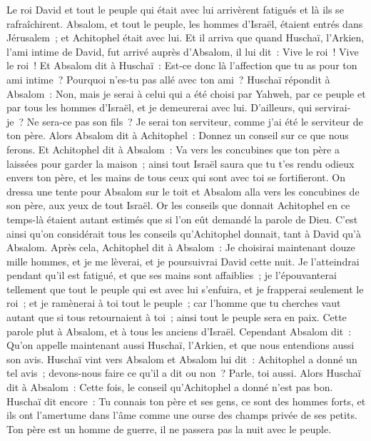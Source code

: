 \begin{multicols}{2}
Le roi David et tout le peuple qui était avec lui arrivèrent fatigués et là ils se rafraîchirent.
Absalom, et tout le peuple, les hommes d'Israël, étaient entrés dans Jérusalem~; et Achitophel était avec lui.
Et il arriva que quand Huschaï, l'Arkien, l'ami intime de David, fut arrivé auprès d'Absalom, il lui dit~: Vive le roi~! Vive le roi~!
Et Absalom dit à Huschaï~: Est-ce donc là l'affection que tu as pour ton ami intime~? Pourquoi n'es-tu pas allé avec ton ami~?
Huschaï répondit à Absalom~: Non, mais je serai à celui qui a été choisi par Yahweh, par ce peuple et par tous les hommes d'Israël, et je demeurerai avec lui.
D'ailleurs, qui servirai-je~? Ne sera-ce pas son fils~? Je serai ton serviteur, comme j'ai été le serviteur de ton père.
Alors Absalom dit à Achitophel~: Donnez un conseil sur ce que nous ferons.
Et Achitophel dit à Absalom~: Va vers les concubines que ton père a laissées pour garder la maison~; ainsi tout Israël saura que tu t'es rendu odieux envers ton père, et les mains de tous ceux qui sont avec toi se fortifieront.
On dressa une tente pour Absalom sur le toit et Absalom alla vers les concubines de son père, aux yeux de tout Israël.
Or les conseils que donnait Achitophel en ce temps-là étaient autant estimés que si l'on eût demandé la parole de Dieu. C'est ainsi qu'on considérait tous les conseils qu'Achitophel donnait, tant à David qu'à Absalom.
\VerseOne{}Après cela, Achitophel dit à Absalom~: Je choisirai maintenant douze mille hommes, et je me lèverai, et je poursuivrai David cette nuit.
Je l'atteindrai pendant qu'il est fatigué, et que ses mains sont affaiblies~; je l'épouvanterai tellement que tout le peuple qui est avec lui s'enfuira, et je frapperai seulement le roi~;
et je ramènerai à toi tout le peuple~; car l'homme que tu cherches vaut autant que si tous retournaient à toi~; ainsi tout le peuple sera en paix.
Cette parole plut à Absalom, et à tous les anciens d'Israël.
Cependant Absalom dit~: Qu'on appelle maintenant aussi Huschaï, l'Arkien, et que nous entendions aussi son avis.
Huschaï vint vers Absalom et Absalom lui dit~: Achitophel a donné un tel avis~; devons-nous faire ce qu'il a dit ou non~? Parle, toi aussi.
Alors Huschaï dit à Absalom~: Cette fois, le conseil qu'Achitophel a donné n'est pas bon.
Huschaï dit encore~: Tu connais ton père et ses gens, ce sont des hommes forts, et ils ont l'amertume dans l'âme comme une ourse des champs privée de ses petits. Ton père est un homme de guerre, il ne passera pas la nuit avec le peuple.

\end{multicols}
